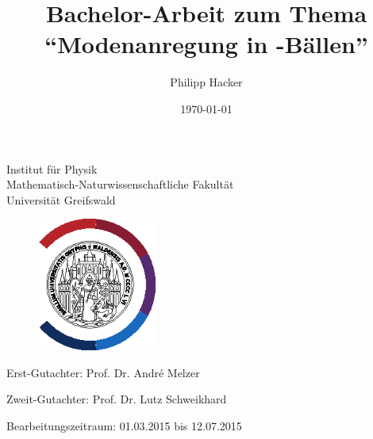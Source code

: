 \documentclass[numbers=noenddot,a4paper,notitlepage,twoside,BCOR15mm]{scrbook}
\title{Bachelor-Arbeit zum Thema \enquote{Modenanregung in \tilt{Yukawa}-Bällen}} %
\author{Philipp Hacker} %
\date{\today}
\begin{document}
	\maketitle

	\begin{center}

		Institut für Physik\\
		Mathematisch-Naturwissenschaftliche Fakultät\\
		Universität Greifswald

	\end{center}
	
	\vspace{0.5cm}

	\begin{figure}[H]
			\centering
			\includegraphics[width=0.35\textwidth]{figs/unilogo_NEU_schwarz.eps}
	\end{figure}

	\vspace{0.5cm}

	\begin{center}

			\hspace{-0.55cm} Erst-Gutachter: Prof. Dr. André Melzer \\ \vspace{0.25cm} %

			Zweit-Gutachter: Prof. Dr. Lutz Schweikhard \\ \vspace{0.25cm} %

			Bearbeitungszeitraum: 01.03.2015 bis 12.07.2015 \\ \vspace{0.25cm} %

%			
%			

	\end{center}
\end{document}
